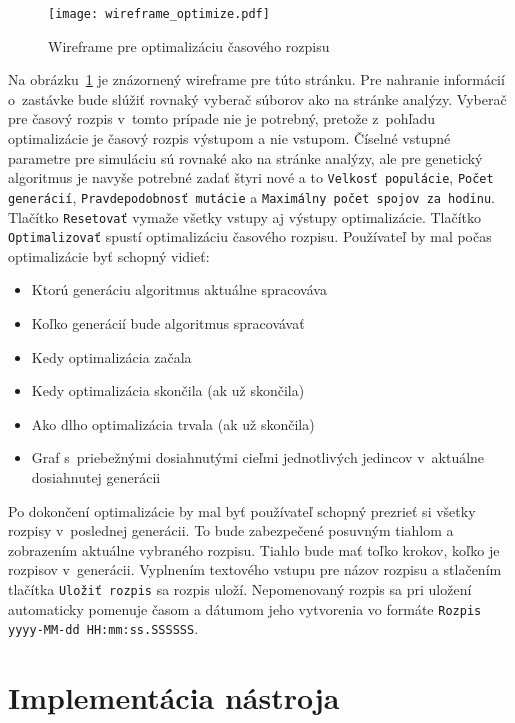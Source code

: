 \begin{figure}[h]\label{fig:wireframe_optimize}
  \centering
  \texttt{[image: wireframe\_optimize.pdf]}
  \caption{Wireframe pre optimalizáciu časového rozpisu}
\end{figure}

Na obrázku~\ref{fig:wireframe_optimize} je znázornený wireframe pre túto stránku.
Pre nahranie informácií o~zastávke bude slúžiť rovnaký vyberač súborov ako na stránke analýzy.
Vyberač pre časový rozpis v~tomto prípade nie je potrebný, pretože z~pohľadu optimalizácie je časový rozpis výstupom a nie vstupom.
Číselné vstupné parametre pre simuláciu sú rovnaké ako na stránke analýzy, ale pre genetický algoritmus je navyše potrebné zadať štyri nové a to \texttt{Velkosť populácie}, \texttt{Počet generácií}, \texttt{Pravdepodobnosť mutácie} a \texttt{Maximálny počet spojov za hodinu}.
Tlačítko \texttt{Resetovať} vymaže všetky vstupy aj výstupy optimalizácie.
Tlačítko \texttt{Optimalizovať} spustí optimalizáciu časového rozpisu.
Používateľ by mal počas optimalizácie byť schopný vidieť:
\begin{itemize}
  \item Ktorú generáciu algoritmus aktuálne spracováva
  \item Koľko generácií bude algoritmus spracovávať
  \item Kedy optimalizácia začala
  \item Kedy optimalizácia skončila (ak už skončila)
  \item Ako dlho optimalizácia trvala (ak už skončila)
  \item Graf s~priebežnými dosiahnutými cieľmi jednotlivých jedincov v~aktuálne dosiahnutej generácii
\end{itemize}
Po dokončení optimalizácie by mal byť používateľ schopný prezrieť si všetky rozpisy v~poslednej generácii.
To bude zabezpečené posuvným tiahlom a zobrazením aktuálne vybraného rozpisu.
Tiahlo bude mať toľko krokov, koľko je rozpisov v~generácii.
Vyplnením textového vstupu pre názov rozpisu a stlačením tlačítka \texttt{Uložiť rozpis} sa rozpis uloží.
Nepomenovaný rozpis sa pri uložení automaticky pomenuje časom a dátumom jeho vytvorenia vo formáte \texttt{Rozpis yyyy-MM-dd HH:mm:ss.SSSSSS}.

\section{Implementácia nástroja}\label{nastroj_implementacia}

